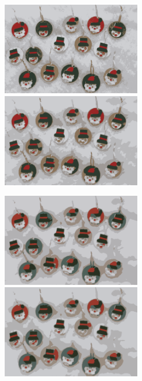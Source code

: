 \begin{center}
\begin{figure}[H]
\centering\includegraphics[width=6cm]{./imgkmeanscluster06-00.png}
\centering\includegraphics[width=6cm]{./imgkmeanscluster06-01.png}\\
\end{figure}
\end{center}
\begin{center}
\begin{figure}[H]
\centering\includegraphics[width=6cm]{./imgkmeanscluster06-02.png}
\centering\includegraphics[width=6cm]{./imgkmeanscluster06-03.png}\\
\end{figure}
\end{center}
